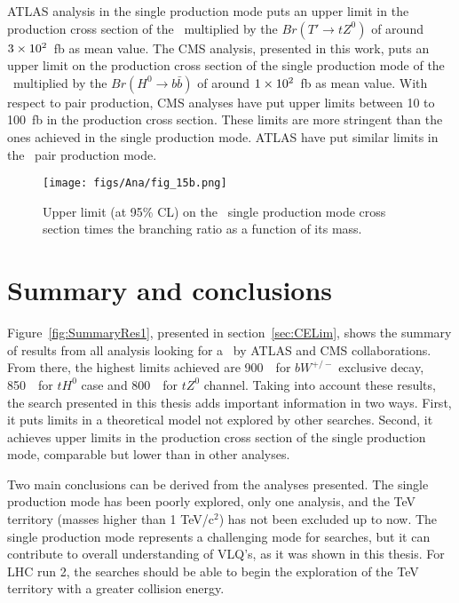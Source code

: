 ATLAS analysis in the single production mode puts an upper limit in the production cross section of the \Tp~multiplied by the $Br(T'\to tZ^{0})$ of around $3\times 10^{2}$~fb as mean value. The CMS analysis, presented in this work, puts an upper limit on the production cross section of the single production mode of the \Tp~multiplied by the $Br(H^{0}\to b\bar{b})$ of around $1\times 10^{2}$~fb as mean value. With respect to pair production, CMS analyses have put upper limits between 10 to 100~fb in the production cross section. These limits are more stringent than the ones achieved in the single production mode. ATLAS have put similar limits in the \Tp~pair production mode.

\begin{figure}[!Hhtbp]
  \begin{center}
    \texttt{[image: figs/Ana/fig\_15b.png]}
    \caption{Upper limit (at 95\% CL) on the \Tp~single production mode cross section times the branching ratio as a function of its mass.}
    \label{fig:SingleATLASres}
  \end{center}
\end{figure}

\section{Summary and conclusions}
\label{sec:SumCon}

Figure~\ref{fig:SummaryRes1}, presented in section~\ref{sec:CELim}, shows the summary of results from all analysis looking for a \Tp~by ATLAS and CMS collaborations. From there, the highest limits achieved are 900~\GeVcc~for $bW^{+/-}$ exclusive decay, 850~\GeVcc~for $tH^{0}$ case and 800~\GeVcc~for $tZ^{0}$ channel. Taking into account these results, the search presented in this thesis adds important information in two ways. First, it puts limits in a theoretical model not explored by other searches. Second, it achieves upper limits in the production cross section of the single production mode, comparable but lower than in other analyses.


Two main conclusions can be derived from the analyses presented. The single production mode has been poorly explored, only one analysis, and the TeV territory (masses higher than 1 TeV/$\text{c}^{2}$) has not been excluded up to now. The single production mode represents a challenging mode for searches, but it can contribute to overall understanding of VLQ's, as it was shown in this thesis. For LHC run 2, the searches should be able to begin the exploration of the TeV territory with a greater collision energy. 